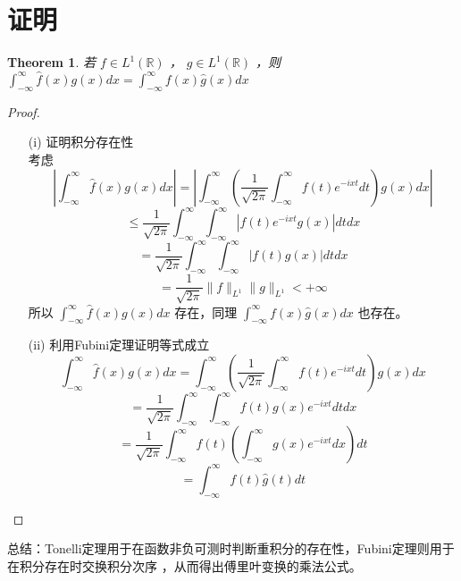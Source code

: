 \documentclass[linespread=1.5,openany]{book}%
\theoremstyle{plain}
\newtheorem{theorem}{Theorem}
\begin{document}
{{				\section{证明}
				\begin{theorem}
					若 \(f \in L^1(\mathbb{R})\) ， \(g \in L^1(\mathbb{R})\) ，则 \(\int_{-\infty}^{\infty}\hat{f}(x)g(x)dx = \int_{-\infty}^{\infty}f(x)\hat{g}(x)dx\)  
				\end{theorem}
				\begin{proof}
					\begin{itemize}
						\item[(i)]证明积分存在性\\
						考虑
						\[\left|\int_{-\infty}^{\infty}\hat{f}(x)g(x)dx\right|=\left|\int_{-\infty}^{\infty}\left(\frac{1}{\sqrt{2\pi}}\int_{-\infty}^{\infty}f(t)e^{-ixt}dt\right)g(x)dx\right|\]
						\[\leq\frac{1}{\sqrt{2\pi}}\int_{-\infty}^{\infty}\int_{-\infty}^{\infty}|f(t)e^{-ixt}g(x)|dtdx\]
						\[=\frac{1}{\sqrt{2\pi}}\int_{-\infty}^{\infty}\int_{-\infty}^{\infty}|f(t)g(x)|dtdx\]
						\[=\frac{1}{\sqrt{2\pi}}\|f\|_{L^1}\|g\|_{L^1}< +\infty
						\]
						所以 \(\int_{-\infty}^{\infty}\hat{f}(x)g(x)dx\) 存在，同理 \(\int_{-\infty}^{\infty}f(x)\hat{g}(x)dx\) 也存在。
						\item[(ii)]利用Fubini定理证明等式成立
						\[
						\int_{-\infty}^{\infty}\hat{f}(x)g(x)dx=\int_{-\infty}^{\infty}\left(\frac{1}{\sqrt{2\pi}}\int_{-\infty}^{\infty}f(t)e^{-ixt}dt\right)g(x)dx\]\[
						=\frac{1}{\sqrt{2\pi}}\int_{-\infty}^{\infty}\int_{-\infty}^{\infty}f(t)g(x)e^{-ixt}dtdx\]\[
						=\frac{1}{\sqrt{2\pi}}\int_{-\infty}^{\infty}f(t)\left(\int_{-\infty}^{\infty}g(x)e^{-ixt}dx\right)dt\]
						\[=\int_{-\infty}^{\infty}f(t)\hat{g}(t)dt\]
					\end{itemize} 
				\end{proof}
				总结：Tonelli定理用于在函数非负可测时判断重积分的存在性，Fubini定理则用于在积分存在时交换积分次序 ，从而得出傅里叶变换的乘法公式。
}}
\end{document}
